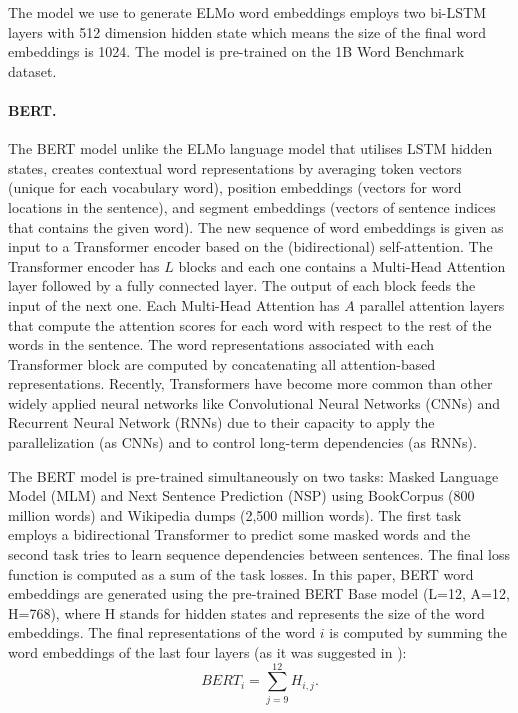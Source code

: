 \documentclass[hidelinks]{llncs}
\begin{document}
The model we use to generate ELMo word embeddings employs two bi-LSTM layers with 512 dimension hidden state which means the size of the final word embeddings is 1024. The model is pre-trained on the 1B Word Benchmark dataset.

\paragraph{BERT. }The BERT model unlike the ELMo language model that utilises LSTM hidden states, creates contextual word representations by averaging token vectors (unique for each vocabulary word), position embeddings (vectors for word locations in the sentence), and segment embeddings (vectors of sentence indices that contains the given word). The new sequence of word embeddings is given as input to a Transformer encoder \cite{vaswani2017attention} based on the (bidirectional) self-attention. 
The Transformer encoder has $L$ blocks and each one contains a Multi-Head Attention layer followed by a fully connected layer. The output of each block feeds the input of the next one. Each Multi-Head Attention has $A$ parallel attention layers that compute the attention scores for each word with respect to the rest of the words in the sentence. The word representations associated with each Transformer block are computed by concatenating all attention-based representations. Recently, Transformers have become more common than other widely applied neural networks like Convolutional Neural Networks (CNNs) and Recurrent Neural Network (RNNs) due to their capacity to apply the parallelization (as CNNs) and to control long-term dependencies (as RNNs). 

The BERT model is pre-trained simultaneously on two tasks: Masked Language Model (MLM) and Next Sentence Prediction (NSP) using BookCorpus (800 million words) and Wikipedia dumps (2,500 million words). The first task employs a bidirectional Transformer to predict some masked words and the second task tries to learn sequence dependencies between sentences. The final loss function is computed as a sum of the task losses. In this paper, BERT word embeddings are generated using the pre-trained BERT Base model (L=12, A=12, H=768), where H stands for hidden states and represents the size of the word embeddings. The final representations of the word $i$ is computed by summing the word embeddings of the last four layers (as it was suggested in \cite{devlin2018bert}):
\begin {equation}
\label{equation10}
BERT_i = \sum_{j = 9}^{12}H_{i, j}.
\end {equation}
\end{document}
